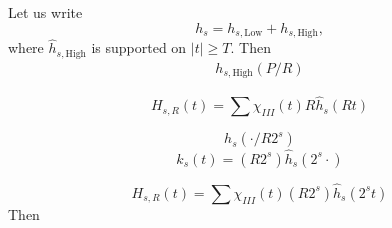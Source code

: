 \documentclass[dvipsnames,letterpaper,12pt]{article}
\begin{document}






Let us write
%
\[ h_s = h_{s,\text{Low}} + h_{s,\text{High}}, \]
%
where $\widehat{h}_{s,\text{High}}$ is supported on $|t| \geq T$. Then
%
\begin{align*}
    h_{s,\text{High}}(P/R)
\end{align*}

\[ H_{s,R}(t) = \sum \chi_{III}(t) R \widehat{h}_s(Rt) \]

\[ h_s( \cdot / R 2^s ) \]
\[ k_s(t) = (R 2^s) \widehat{h}_s(2^s \cdot) \]

\[ H_{s,R}(t) = \sum \chi_{III}(t) (R 2^s) \widehat{h}_s(2^s t) \]
%
Then





\end{document}
